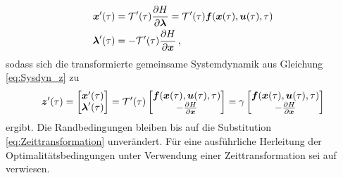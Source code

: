 \begin{align}
\boldsymbol{x}'(\tau) &= \mathcal{T}'(\tau)\frac{\partial H}{\partial\boldsymbol{\lambda}} = \mathcal{T}'(\tau)\boldsymbol{f}(\boldsymbol{x}(\tau),\boldsymbol{u}(\tau),\tau) \label{eq:Zustandsdgl_tau} \\
\boldsymbol{\lambda}'(\tau) &= -\mathcal{T}'(\tau)\frac{\partial H}{\partial \boldsymbol{x}}\,, \label{eq:Adjdgl_tau} \\
\end{align}
sodass sich die transformierte gemeinsame Systemdynamik aus Gleichung \eqref{eq:Sysdyn_z} zu 
\begin{equation}
	\boldsymbol{z}'(\tau) = \begin{bmatrix}
	\boldsymbol{x}'(\tau) \\
	\boldsymbol{\lambda}'(\tau)
	\end{bmatrix} = \mathcal{T}'(\tau)
	\begin{bmatrix}
	\boldsymbol{f}(\boldsymbol{x}(\tau),\boldsymbol{u}(\tau),\tau) \\
	-\frac{\partial H}{\partial \boldsymbol{x}}
	\end{bmatrix} = 
	\gamma
	\begin{bmatrix}
	\boldsymbol{f}(\boldsymbol{x}(\tau),\boldsymbol{u}(\tau),\tau) \\
	-\frac{\partial H}{\partial \boldsymbol{x}}
	\end{bmatrix} \label{eq:Sysdyn_z_tau}
\end{equation} 
ergibt. Die Randbedingungen bleiben bis auf die Substitution \eqref{eq:Zeittransformation} unverändert. Für eine ausführliche Herleitung der Optimalitätsbedingungen unter Verwendung einer Zeittransformation sei auf \cite{Gerdts.2010} verwiesen.

